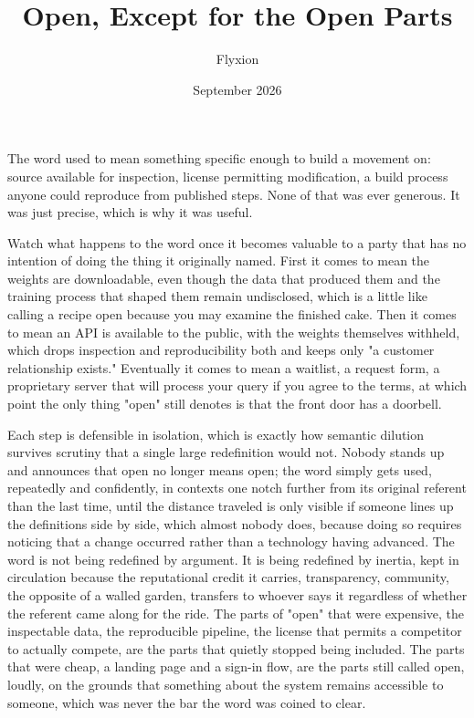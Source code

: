 \documentclass[11pt]{article}
\title{Open, Except for the Open Parts}
\author{Flyxion}
\date{September 2026}
\begin{document}
\maketitle

The word used to mean something specific enough to build a movement on: source available for inspection, license permitting modification, a build process anyone could reproduce from published steps. None of that was ever generous. It was just precise, which is why it was useful.

Watch what happens to the word once it becomes valuable to a party that has no intention of doing the thing it originally named. First it comes to mean the weights are downloadable, even though the data that produced them and the training process that shaped them remain undisclosed, which is a little like calling a recipe open because you may examine the finished cake. Then it comes to mean an API is available to the public, with the weights themselves withheld, which drops inspection and reproducibility both and keeps only "a customer relationship exists." Eventually it comes to mean a waitlist, a request form, a proprietary server that will process your query if you agree to the terms, at which point the only thing "open" still denotes is that the front door has a doorbell.

Each step is defensible in isolation, which is exactly how semantic dilution survives scrutiny that a single large redefinition would not. Nobody stands up and announces that open no longer means open; the word simply gets used, repeatedly and confidently, in contexts one notch further from its original referent than the last time, until the distance traveled is only visible if someone lines up the definitions side by side, which almost nobody does, because doing so requires noticing that a change occurred rather than a technology having advanced. The word is not being redefined by argument. It is being redefined by inertia, kept in circulation because the reputational credit it carries, transparency, community, the opposite of a walled garden, transfers to whoever says it regardless of whether the referent came along for the ride. The parts of "open" that were expensive, the inspectable data, the reproducible pipeline, the license that permits a competitor to actually compete, are the parts that quietly stopped being included. The parts that were cheap, a landing page and a sign-in flow, are the parts still called open, loudly, on the grounds that something about the system remains accessible to someone, which was never the bar the word was coined to clear.
\end{document}
